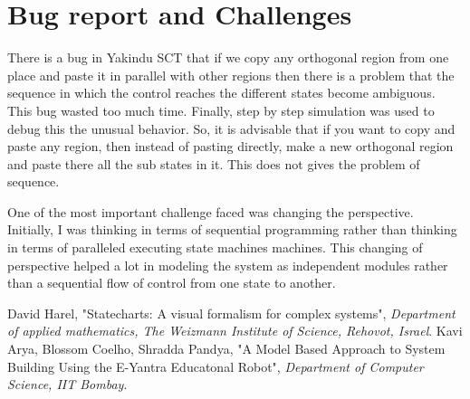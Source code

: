 \documentclass[a4paper,12pt,oneside]{book}
\begin{document}
\section{Bug report and Challenges}
There is a bug in Yakindu SCT that if we copy any orthogonal region from one place and paste it in parallel with other regions then there is a problem that the sequence in which the control reaches the different states become ambiguous. This bug wasted too much time. Finally, step by step simulation was used to debug this the unusual behavior. So, it is advisable that if you want to copy and paste any region, then instead of pasting directly, make a new orthogonal region and paste there all the sub states in it. This does not gives the problem of sequence.

One of the most important challenge faced was changing the perspective. Initially, I was thinking in terms of sequential programming rather than thinking in terms of paralleled executing state machines machines. This changing of perspective helped a lot in modeling the system as independent modules rather than a sequential flow of control from one state to another. 
\begin{thebibliography}{li}
 David Harel, "Statecharts: A visual formalism for complex systems", \emph{Department of applied mathematics, The Weizmann Institute
	of Science, Rehovot, Israel}.
 Kavi Arya, Blossom Coelho, Shradda Pandya, "A Model Based Approach to System Building Using the E-Yantra Educatonal Robot", \emph{Department of Computer Science, IIT Bombay}.
\end{thebibliography}
\end{document}
